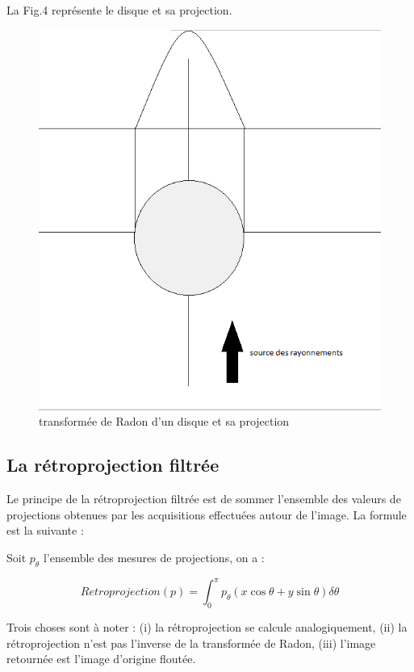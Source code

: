 \documentclass[conference]{IEEEtran}
\begin{document}
La Fig.4 représente le disque et sa projection.

\begin{figure}[H]
\centering
\includegraphics[scale=0.4]{transformeRadon}
\caption[transformée de Radon d'un disque et sa projection]{transformée de Radon d'un disque et sa projection}
\label{fig:gallery}
\end{figure}


\subsection{La rétroprojection filtrée}

Le principe de la rétroprojection filtrée est de sommer l'ensemble des valeurs de projections obtenues par les acquisitions effectuées autour de l'image. La formule est la suivante :

Soit $p_\theta$ l'ensemble des mesures de projections, on a :

\[Retroprojection(p)=\int_0^\pi p_\theta(x\cos\theta+y\sin\theta)\delta\theta \]

Trois choses sont à noter : (i) la rétroprojection se calcule analogiquement, (ii) la rétroprojection n'est pas l'inverse de la transformée de Radon, (iii) l'image retournée est l'image d'origine floutée.
\end{document}
